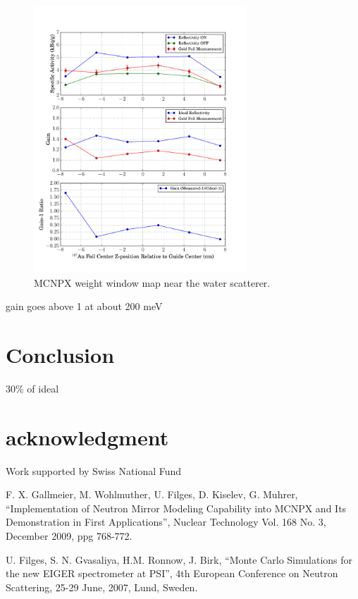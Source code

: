 \documentclass[a4paper,
              ]{jacow}
\begin{document}
\begin{figure}[!htb]
   \centering
   \includegraphics*[trim = 0mm 0mm 15mm 0mm, width=80mm]{graphics/GF_act.pdf}
   \caption{MCNPX weight window map near the water scatterer.}
   \label{activation}
\end{figure}

gain goes above 1 at about 200 meV


\section{Conclusion}

30\% of ideal


\section{acknowledgment}

Work supported by Swiss National Fund



\begin{thebibliography}{99} %

	F. X. Gallmeier, M. Wohlmuther, U. Filges, D. Kiselev, G. Muhrer,
	``Implementation of Neutron Mirror Modeling Capability into MCNPX and Its Demonstration in First Applications'',
  Nuclear Technology Vol. 168 No. 3, December 2009, ppg 768-772.

  U. Filges, S. N. Gvasaliya, H.M. Ronnow, J. Birk,
  ``Monte Carlo Simulations for the new EIGER spectrometer at PSI'',
  4th European Conference on Neutron Scattering, 25-29 June, 2007, Lund, Sweden.

\end{thebibliography}
\end{document}
